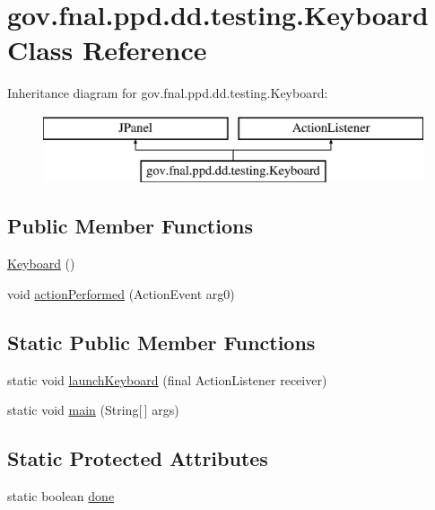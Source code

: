 \hypertarget{classgov_1_1fnal_1_1ppd_1_1dd_1_1testing_1_1Keyboard}{\section{gov.\-fnal.\-ppd.\-dd.\-testing.\-Keyboard Class Reference}
\label{classgov_1_1fnal_1_1ppd_1_1dd_1_1testing_1_1Keyboard}
}
Inheritance diagram for gov.\-fnal.\-ppd.\-dd.\-testing.\-Keyboard\-:\begin{figure}[H]
\begin{center}
\leavevmode
\includegraphics[height=2.000000cm]{classgov_1_1fnal_1_1ppd_1_1dd_1_1testing_1_1Keyboard}
\end{center}
\end{figure}
\subsection*{Public Member Functions}
\begin{DoxyCompactItemize}
\item 
\hyperlink{classgov_1_1fnal_1_1ppd_1_1dd_1_1testing_1_1Keyboard_a81d006adf3cc965f2860fe6879a7efb9}{Keyboard} ()
\item 
void \hyperlink{classgov_1_1fnal_1_1ppd_1_1dd_1_1testing_1_1Keyboard_a668187de053316116d61b9b3652b24af}{action\-Performed} (Action\-Event arg0)
\end{DoxyCompactItemize}
\subsection*{Static Public Member Functions}
\begin{DoxyCompactItemize}
\item 
static void \hyperlink{classgov_1_1fnal_1_1ppd_1_1dd_1_1testing_1_1Keyboard_ad18a9c7d9d10895547f73ec00c4e2cbc}{launch\-Keyboard} (final Action\-Listener receiver)
\item 
static void \hyperlink{classgov_1_1fnal_1_1ppd_1_1dd_1_1testing_1_1Keyboard_a9b874638a02ac5f87df622f2b560a367}{main} (String\mbox{[}$\,$\mbox{]} args)
\end{DoxyCompactItemize}
\subsection*{Static Protected Attributes}
\begin{DoxyCompactItemize}
\item 
static boolean \hyperlink{classgov_1_1fnal_1_1ppd_1_1dd_1_1testing_1_1Keyboard_abaa375abcfb1ee475b9c2640bbfc7b0c}{done}
\end{DoxyCompactItemize}


